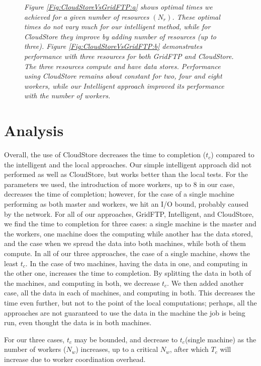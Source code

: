 \documentclass{rspublic}
\begin{document}
\begin{figure}
\begin{center}
{\label{Fig:CloudStoreVsGridFTP:b}
}
\caption{\textit{Figure \ref{Fig:CloudStoreVsGridFTP:a}
 shows optimal times we achieved
for a given number of resources $(N_{r})$. These optimal times do not vary much for our intelligent method, while for CloudStore they improve by adding number of resources (up to three). Figure \ref{Fig:CloudStoreVsGridFTP:b}
demonstrates performance with three resources for both GridFTP and
CloudStore. The three resources compute and have data stores. Performance using CloudStore remains about constant for two, four and eight workers, while our Intelligent approach improved its performance with the number of workers.}}
\label{Fig:CloudStoreVsGridFTP}
\end{center}
\end{figure}

%

\section{Analysis}

Overall, the use of CloudStore decreases the time to completion
($t_c$) compared to the intelligent and the local approaches. Our
simple intelligent approach did not performed as well as CloudStore, but
works better than the local tests. For the parameters we used, the
introduction of more workers, up to 8 in our case, decreases the time of
completion; however, for the case of a single machine performing as both
master and workers, we hit an I/O bound, probably caused by the network.
For all of our approaches, GridFTP, Intelligent, and CloudStore, we find
the time to completion for three cases: a single machine is the master
and the workers, one machine does the computing while another has the
data stored, and the case when we spread the data into both machines,
while both of them compute.  In all of our three approaches, the case of
a single machine, shows the least $t_c$. In the case of two machines,
having the data in one, and computing in the other one, increases the
time to completion. By splitting the data in both of the machines, and
computing in both, we decrease $t_c$. We then added another case, all
the data in each of machines, and computing in both. This decreases the
time even further, but not to the point of the local computations;
perhaps, all the approaches are not guaranteed to use the data in the
machine the job is being run, even thought the data is in both machines.

For our three cases,  $t_c$ may be bounded, and decrease to $t_c$(single
machine) as  the number of workers ($N_w$) increases, up to a critical
$N_w$, after which $T_c$ will increase due to worker coordination
overhead.
\end{document}
